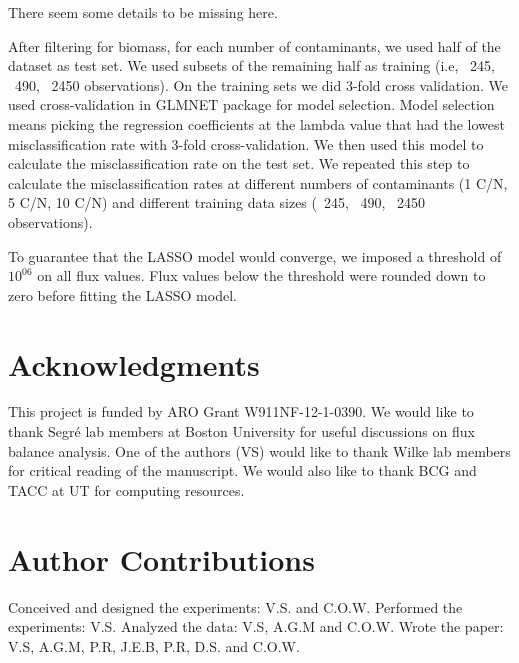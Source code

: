\documentclass[12pt]{article}
\begin{document}
{\color{red}There seem some details to be missing here.}

After filtering for biomass, for each number of contaminants, we used half of the dataset as test set. We used subsets of the remaining half as training (i.e, ~245, ~490, ~2450 observations). On the training sets we did 3-fold cross validation. We used cross-validation in GLMNET package for model selection. Model selection means picking the regression coefficients at the lambda value that had the lowest misclassification rate with 3-fold cross-validation. We then used this model to calculate the misclassification rate on the test set. We repeated this step to calculate the misclassification rates at different numbers of contaminants (1 C/N, 5 C/N, 10 C/N) and different training data sizes (~245, ~490, ~2450 observations).

To guarantee that the LASSO model would converge, we imposed a threshold of $10^{06}$ on all flux values. Flux values below the threshold were rounded down to zero before fitting the LASSO model.

\section*{Acknowledgments}
This project is funded by ARO Grant W911NF-12-1-0390. We would like to thank Segr\'e lab members at Boston University for useful discussions on flux balance analysis. One of the authors (VS) would like to thank Wilke lab members for critical reading of the manuscript. We would also like to thank BCG and TACC at UT for computing resources. 

\section*{Author Contributions}
Conceived and designed the experiments: V.S. and C.O.W. Performed the experiments: V.S. Analyzed the data: V.S, A.G.M and C.O.W. Wrote the paper: V.S, A.G.M, P.R, J.E.B, P.R, D.S. and C.O.W.




\newpage
\end{document}
